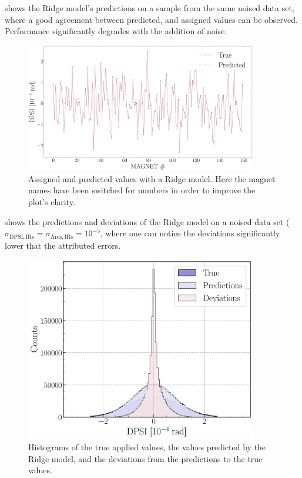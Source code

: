  shows the Ridge model's predictions on a sample from the same noised data set, where a good agreement between predicted, and assigned values can be observed.
Performance significantly degrades with the addition of noise.

\begin{figure}[!htb]
  \centering
  \includegraphics*[width=0.9\textwidth]{Figures/ML_for_IR_Coupling/ridge_predictions.pdf}
  \caption{Assigned and predicted values \DPSI with a Ridge model. Here the magnet names have been switched for numbers in order to improve the plot's clarity.}
  \label{fig:ridge_predictions}
\end{figure}

 shows the predictions and deviations of the Ridge model on a noised data set (\(\sigma_{\mathrm{DPSI, IRs}} = \sigma_{\mathrm{Arcs, IRs}} = 10^{-5}\), where one can notice the deviations significantly lower that the attributed errors.

\begin{figure}[!htb]
  \centering
  \includegraphics*[width=0.9\textwidth]{Figures/ML_for_IR_Coupling/ridge_histograms.pdf}
  \caption{Histograms of the true applied \DPSI values, the values predicted by the Ridge model, and the deviations from the predictions to the true values.}
  \label{fig:ridge_histograms}
\end{figure}

